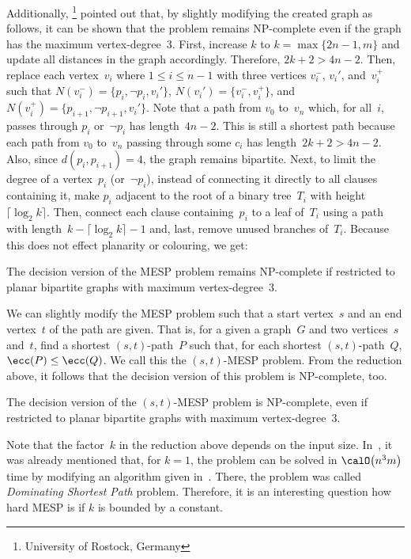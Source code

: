Additionally, \footnote{University of Rostock, Germany} pointed out that, by slightly modifying the created graph as follows, it can be shown that the problem remains NP-complete even if the graph has the maximum vertex-degree~$3$.
First, increase $k$ to $k = \max \{ 2n - 1, m \}$ and update all distances in the graph accordingly.
Therefore, $2k + 2 > 4n - 2$.
Then, replace each vertex~$v_i$ where $1 \leq i \leq n - 1$ with three vertices $v_i^-$, $v_i'$, and~$v_i^+$ such that $N(v_i^-) = \{ p_i, \neg p_i, v_i' \}$, $N(v_i') = \{ v_i^-, v_i^+ \}$, and $N(v_i^+) = \{ p_{i+1}, \neg p_{i+1}, v_i' \}$.
Note that a path from $v_0$ to~$v_n$ which, for all~$i$, passes through $p_i$ or~$\neg p_i$ has length~$4n - 2$.
This is still a shortest path because each path from $v_0$ to~$v_n$ passing through some $c_i$ has length~$2k + 2 > 4n - 2$.
Also, since $d(p_i, p_{i+1}) = 4$, the graph remains bipartite.
Next, to limit the degree of a vertex~$p_i$ (or~$\neg p_i$), instead of connecting it directly to all clauses containing it, make $p_i$ adjacent to the root of a binary tree~$T_i$ with height~$\lceil \log_2 k \rceil$.
Then, connect each clause containing~$p_i$ to a leaf of~$T_i$ using a path with length~$k - \lceil \log_2 k \rceil - 1$ and, last, remove unused branches of~$T_i$.
Because this does not effect planarity or colouring, we get:

\begin{corollary}
    \label{cor:mespNPc_planarBipMaxDeg}
The decision version of the MESP problem remains NP-complete if restricted to planar bipartite graphs with maximum vertex-degree~\( 3 \).
\end{corollary}

We can slightly modify the MESP problem such that a start vertex~$s$ and an end vertex~$t$ of the path are given.
That is, for a given a graph~$G$ and two vertices~$s$ and~$t$, find a shortest $(s,t)$-path~$P$ such that, for each shortest $(s,t)$-path~$Q$, $\ecc(P) \leq \ecc(Q)$.
We call this the $(s,t)$-MESP problem.
From the reduction above, it follows that the decision version of this problem is NP-complete, too.

\begin{corollary}
    \label{cor:stMespNPc}
The decision version of the \( (s,t) \)-MESP problem is NP-complete, even if restricted to planar bipartite graphs with maximum vertex-degree~\( 3 \).
\end{corollary}

Note that the factor~$k$ in the reduction above depends on the input size.
In~\cite{Kratsch2000}, it was already mentioned that, for $k = 1$, the problem can be solved in $\calO \big( n^3m \big)$ time by modifying an algorithm given in~\cite{DeogunKratsc1995}.
There, the problem was called \emph{Dominating Shortest Path} problem.
Therefore, it is an interesting question how hard MESP is if $k$ is bounded by a constant.

